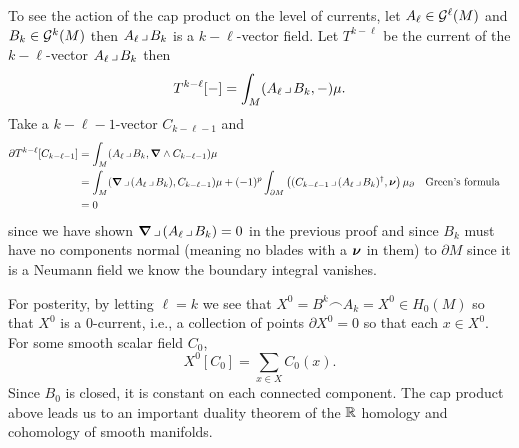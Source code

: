 \documentclass{article}
\begin{document}
To see the action of the cap product on the level of currents, let $A_\ell \in \mathcal{G}^\ell(M)$ and $B_k \in \mathcal{G}^k(M)$ then $A_\ell \hspace*{.5mm}\lrcorner \hspace*{.5mm} B_k$ is a $k-\ell$-vector field. Let $T^{k-\ell}$ be the current of the $k-\ell$-vector $A_\ell \hspace*{.5mm}\lrcorner \hspace*{.5mm} B_k$ then
\begin{equation}
T^{k-\ell}[-] = \int_M (A_\ell \hspace*{.5mm}\lrcorner \hspace*{.5mm} B_k, -)\mu.
\end{equation}
Take a $k-\ell-1$-vector $C_{k-\ell-1}$ and 
\begin{align}
    \partial T^{k-\ell}[C_{k-\ell-1}] &= \int_M (A_\ell \hspace*{.5mm}\lrcorner \hspace*{.5mm} B_k, \boldsymbol{\nabla} \wedge C_{k-\ell-1})\mu\\
    &= \int_M (\boldsymbol{\nabla} \hspace*{.5mm}\lrcorner \hspace*{.5mm} (A_\ell \hspace*{.5mm}\lrcorner \hspace*{.5mm} B_k),C_{k-\ell-1})\mu + (-1)^p\int_{\partial M} \left((C_{k - \ell -1} \hspace*{.5mm}\lrcorner \hspace*{.5mm} (A_\ell \hspace*{.5mm}\lrcorner \hspace*{.5mm} B_k)^\dagger,\boldsymbol{\nu}\right)\mu_\partial && \textrm{Green's formula}\\ 
    &= 0
\end{align}
since we have shown $\boldsymbol{\nabla} \hspace*{.5mm}\lrcorner \hspace*{.5mm} (A_\ell \hspace*{.5mm}\lrcorner \hspace*{.5mm} B_k)=0$ in the previous proof and since $B_k$ must have no components normal (meaning no blades with a $\boldsymbol{\nu}$ in them) to $\partial M$ since it is a Neumann field we know the boundary integral vanishes.

For posterity, by letting $\ell = k$ we see that $X^0 = B^k \frown A_k = X^0 \in H_0(M)$ so that $X^0$ is a $0$-current, i.e., a collection of points $\partial X^0 = 0$ so that each $x\in X^0$. For some smooth scalar field $C_0$,
\begin{equation}
X^0[C_0] = \sum_{x\in X} C_0(x).
\end{equation}
Since $B_0$ is closed, it is constant on each connected component. The cap product above leads us to an important duality theorem of the $\mathbb{R}$ homology and cohomology of smooth manifolds.
\end{document}

